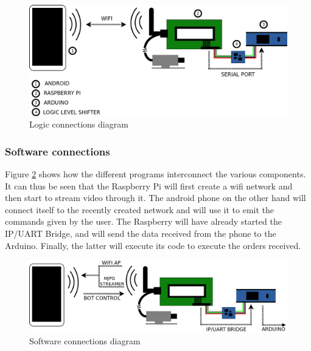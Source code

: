 	\begin{figure}[H]
			\centering
			\includegraphics[width=15cm, angle=0]{images/Diagrams/logic.png}
			\caption{Logic connections diagram }
			\label{logicDiagram}
	\end{figure}
	\bigskip


\subsubsection{Software connections}

Figure \ref{swDiagram} shows how the different programs interconnect the various components. It can thus be seen that the Raspberry Pi will first create a wifi network and then start to stream video through it. The android phone on the other hand will connect itself to the recently created network and will use it to emit the commands given by the user. The Raspberry will have already started the IP/UART Bridge, and will send the data received from the phone to the Arduino. Finally, the latter will execute its code to execute the orders received.\\

	\begin{figure}[H]
			\centering
			\includegraphics[width=15cm, angle=0]{images/Diagrams/software.png}
			\caption{Software connections diagram }
			\label{swDiagram}
	\end{figure}
	\bigskip

